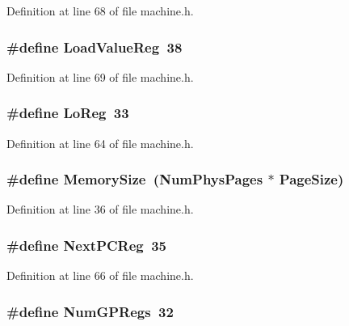 Definition at line 68 of file machine.\+h.

\subsubsection[{Load\+Value\+Reg}]{\setlength{\rightskip}{0pt plus 5cm}\#define Load\+Value\+Reg~38}\label{machine_8h_a56dbce970aafbc98848593b4d4aa5eb7}


Definition at line 69 of file machine.\+h.

\subsubsection[{Lo\+Reg}]{\setlength{\rightskip}{0pt plus 5cm}\#define Lo\+Reg~33}\label{machine_8h_afef46928a742121ce69b65dad1fb625a}


Definition at line 64 of file machine.\+h.

\subsubsection[{Memory\+Size}]{\setlength{\rightskip}{0pt plus 5cm}\#define Memory\+Size~({\bf Num\+Phys\+Pages} $\ast$ {\bf Page\+Size})}\label{machine_8h_ab1eabbc583c21d48596127b19d4ce754}


Definition at line 36 of file machine.\+h.

\subsubsection[{Next\+P\+C\+Reg}]{\setlength{\rightskip}{0pt plus 5cm}\#define Next\+P\+C\+Reg~35}\label{machine_8h_af95022bd1d0769baabadf6f1b771501a}


Definition at line 66 of file machine.\+h.

\subsubsection[{Num\+G\+P\+Regs}]{\setlength{\rightskip}{0pt plus 5cm}\#define Num\+G\+P\+Regs~32}\label{machine_8h_a89f6b3d90852476c519744e6c0fdc5ff}



